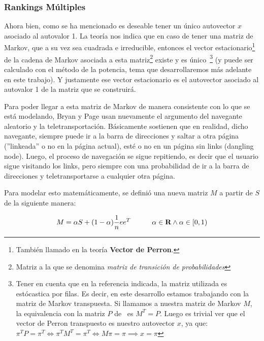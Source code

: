 \subsubsection{Rankings M\'ultiples}\label{subsubsec:mult_ranks}
\par Ahora bien, como se ha mencionado es deseable tener un \'unico autovector
$x$ asociado al autovalor 1. La teor\'ia nos indica que en caso de tener una
matriz de Markov, que a su vez sea cuadrada e irreducible, entonces el vector
estacionario\footnote{Tambi\'en llamado en la teor\'ia \textbf{Vector de
Perron}.} de la cadena de Markov asociada a esta matriz\footnote{Matriz a la que
se denomina \emph{matriz de transici\'on de probabilidades}} existe y es
\'unico~\cite[p.693]{Meyer2000}\footnote{Tener en cuenta que en la referencia
indicada, la matriz utilizada es est\'ocastica por filas. Es decir, en este
desarrollo estamos trabajando con la matriz de Markov transpuesta. Si llamamos a
nuestra matriz de Markov $M$, la equivalencia con la matriz $P$
de~\cite[p.693]{Meyer2000} es $M^T = P$. Luego es trivial ver que el vector de
Perron transpuesto es nuestro autovector $x$, ya que: $\pi^TP =\pi^T \iff
\pi^TM^T=\pi^T \iff M\pi=\pi \implies x=\pi$} (y puede ser calculado con el
m\'etodo de la potencia, tema que desarrollaremos m\'as adelante en este
trabajo). Y justamente ese vector estacionario es el autovector asociado al
autovalor 1 de la matriz que se construir\'a.

\par Para poder llegar a esta matriz de Markov de manera consistente con lo
que se est\'a modelando, Bryan y Page usan nuevamente el argumento del navegante
aleatorio y la teletransportaci\'on.  B\'asicamente sostienen que en realidad,
dicho navegante, siempre puede ir a la barra de direcciones y saltar a otra
p\'agina (''linkeada'' o no en la p\'agina actual), est\'e o no en un p\'agina
sin links (dangling node). Luego, el proceso de navegaci\'on se sigue
repitiendo, es decir que el usuario sigue visitando los links, pero siempre con
una probabilidad de ir a la barra de direcciones y teletransportarse a cualquier
otra p\'agina.

\par Para modelar esto matem\'aticamente, se defini\'o una nueva matriz
$M$ a partir de $S$ de la siguiente manera:

\begin{equation}
    M = \alpha S + (1-\alpha) \frac{1}{n}ee^T \quad\quad\quad \alpha\in\real
    \land \alpha\in\left[0,1\right) \label{eq:M_def}
\end{equation}

